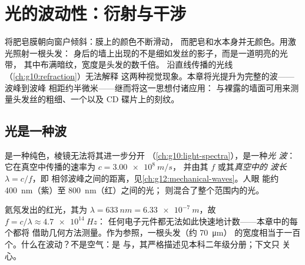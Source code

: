 \chapter{光的波动性：衍射与干涉}\label{ch:g12:light-as-wave}

将肥皂膜朝向窗户倾斜：膜上的颜色不断滑动，
而肥皂和水本身并无颜色。用激光照射一根头发：
身后的墙上出现的不是细如发丝的影子，而是一道明亮的光带，
其中布满暗纹，宽度是头发的数千倍。
沿直线传播的光线（\cref{ch:g10:refraction}）无法解释
这两种视觉现象。本章将光提升为完整的波——波峰到波峰
相距约半微米——继而将这一思想付诸应用：
与裸露的墙面可用来测量头发丝的粗细、一个以及 CD 碟片上的刻纹。

\section{光是一种波}

\begin{definition}[光波]\label{def:g12:light-as-wave:lightwave}
是一种纯色，棱镜无法将其进一步分开
（\cref{ch:g10:light-spectra}），是一种\emph{光
波}：它在真空中传播的速率为 $c = \qty{3.00e8}{m/s}$，
并由其 $f$ 或其\emph{真空中的
波长} $\lambda = c/f$，即
相邻波峰之间的距离，见\cref{ch:g12:mechanical-waves}。人眼
能约 \qty{400}{nm}（紫）至 \qty{800}{nm}（红）之间的光；
则混合了整个范围内的光。
\end{definition}

\begin{example}[数量级]\label{ex:g12:light-as-wave:orders}
氦氖发出的红光，其为 $\lambda = \qty{633}{nm} =
\qty{6.33e-7}{m}$，故 $f = c/\lambda \approx \qty{4.7e14}{Hz}$：
任何电子元件都无法如此快速地计数——本章中的每个都将
借助几何方法测量。作为参照，一根头发（约 \qty{70}{\micro m}）
的宽度相当于一百个。什么在波动？不是空气：是
与，其严格描述见本科二年级分册；下文只
关心。
\end{example}

